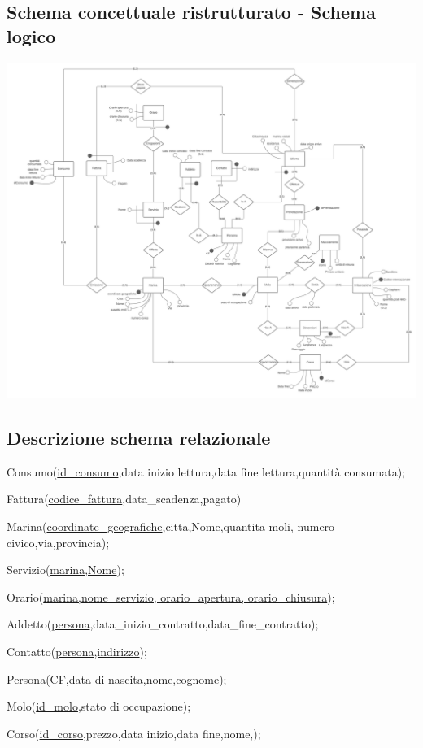 \subsection{Schema concettuale ristrutturato - Schema logico}
\includegraphics[width=\textwidth]{img/erlogico.png}


\subsection{Descrizione schema relazionale}

Consumo(\underline{id\_consumo},data inizio lettura,data fine lettura,quantità consumata);

Fattura(\underline{codice\_fattura},data\_scadenza,pagato) 

Marina(\underline{coordinate\_geografiche},citta,Nome,quantita moli, numero civico,via,provincia);

Servizio(\underline{marina,Nome});

Orario(\underline{marina,nome\_servizio, orario\_apertura, orario\_chiusura});

Addetto(\underline{persona},data\_inizio\_contratto,data\_fine\_contratto);

Contatto(\underline{persona,indirizzo});

Persona(\underline{CF},data di nascita,nome,cognome);

Molo(\underline{id\_molo},stato di occupazione);

Corso(\underline{id\_corso},prezzo,data inizio,data fine,nome,);

